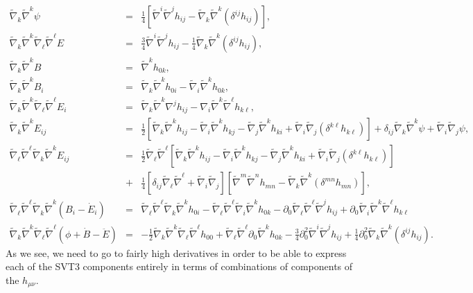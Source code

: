 \documentclass[aps,onecolumn,10pt]{revtex4}
\numberwithin{equation}{section}
\numberwithin{equation}{section}
\begin{document}
\begin{eqnarray}
\tilde{\nabla}_k\tilde{\nabla}^k\psi&=&\frac{1}{4} \left[\tilde{\nabla}^i \tilde{\nabla}^jh_{ij}-\tilde{\nabla}_k\tilde{\nabla}^k(\delta^{ij}h_{ij})\right],
\nonumber\\
\tilde{\nabla}_k\tilde{\nabla}^k\tilde{\nabla}_{\ell}\tilde{\nabla}^{\ell}E&=&\frac{3}{4} \tilde{\nabla}^i \tilde{\nabla}^jh_{ij}-\frac{1}{4}\tilde{\nabla}_k\tilde{\nabla}^k(\delta^{ij}h_{ij}),
\nonumber\\
\tilde{\nabla}_k\tilde{\nabla}^kB&=&\tilde{\nabla}^kh_{0k},
\nonumber\\
\tilde{\nabla}_k\tilde{\nabla}^kB_i&=&\tilde{\nabla}_k\tilde{\nabla}^kh_{0i}-\tilde{\nabla}_i\tilde{\nabla}^kh_{0k},
  \nonumber\\
 \tilde{\nabla}_k\tilde{\nabla}^k\tilde{\nabla}_{\ell}\tilde{\nabla}^{\ell}E_i&=&\tilde{\nabla}_k\tilde{\nabla}^k\nabla^jh_{ij}-\nabla_i\tilde{\nabla}^k\tilde{\nabla}^{\ell}h_{k\ell},
 \nonumber\\
 \tilde{\nabla}_k\tilde{\nabla}^kE_{ij}&=&\frac{1}{2}\left[\tilde{\nabla}_k\tilde{\nabla}^kh_{ij}-\tilde{\nabla}_i\tilde{\nabla}^kh_{kj}-\tilde{\nabla}_j\tilde{\nabla}^kh_{ki}+\tilde{\nabla}_i\tilde{\nabla}_j(\delta^{k\ell}h_{k\ell})\right]
 +\delta_{ij}\tilde{\nabla}_k\tilde{\nabla}^k\psi+\tilde{\nabla}_i\tilde{\nabla}_j\psi,
 \nonumber\\
 \tilde{\nabla}_{\ell}\tilde{\nabla}^{\ell}\tilde{\nabla}_k\tilde{\nabla}^kE_{ij}&=&
\frac{1}{2} \tilde{\nabla}_{\ell}\tilde{\nabla}^{\ell}\left[\tilde{\nabla}_k\tilde{\nabla}^kh_{ij}-\tilde{\nabla}_i\tilde{\nabla}^kh_{kj}-\tilde{\nabla}_j\tilde{\nabla}^kh_{ki}+\tilde{\nabla}_i\tilde{\nabla}_j(\delta^{k\ell}h_{k\ell})\right]
 \nonumber\\
&+&\frac{1}{4}\left[\delta_{ij}\tilde{\nabla}_{\ell}\tilde{\nabla}^{\ell}+\tilde{\nabla}_i\tilde{\nabla}_j \right]\left[\tilde{\nabla}^m \tilde{\nabla}^nh_{mn}-\tilde{\nabla}_k\tilde{\nabla}^k(\delta^{mn}h_{mn}) \right],
\nonumber\\
\tilde{\nabla}_{\ell}\tilde{\nabla}^{\ell} \tilde{\nabla}_k\tilde{\nabla}^k(B_i-\dot{E}_i)&=&
\tilde{\nabla}_{\ell}\tilde{\nabla}^{\ell}\tilde{\nabla}_k\tilde{\nabla}^kh_{0i}
-\tilde{\nabla}_{\ell}\tilde{\nabla}^{\ell}\tilde{\nabla}_i\tilde{\nabla}^kh_{0k}
-\partial_0\tilde{\nabla}_{\ell}\tilde{\nabla}^{\ell}\tilde{\nabla}^jh_{ij}
+\partial_0\tilde{\nabla}_{i}\tilde{\nabla}^{k}\tilde{\nabla}^{\ell}h_{k\ell}
\nonumber\\
 \tilde{\nabla}_k\tilde{\nabla}^k\tilde{\nabla}_{\ell}\tilde{\nabla}^{\ell}(\phi+\dot{B}-\ddot{E})&=&
 -\tfrac{1}{2}\tilde{\nabla}_k\tilde{\nabla}^k\tilde{\nabla}_{\ell}\tilde{\nabla}^{\ell}h_{00}
 +\tilde{\nabla}_{\ell}\tilde{\nabla}^{\ell}\partial_0\tilde{\nabla}^kh_{0k}
 -\tfrac{3}{4}\partial_0^2\tilde{\nabla}^i\tilde{\nabla}^jh_{ij}
  +\tfrac{1}{4}\partial_0^2\tilde{\nabla}_{k}\tilde{\nabla}^{k}(\delta^{ij}h_{ij}).
\label{2.6}
 \end{eqnarray}
As we see, we need to go to fairly high derivatives in order to be able to express each of the SVT3 components entirely in terms of combinations of components of the $h_{\mu\nu}$.
\end{document}
